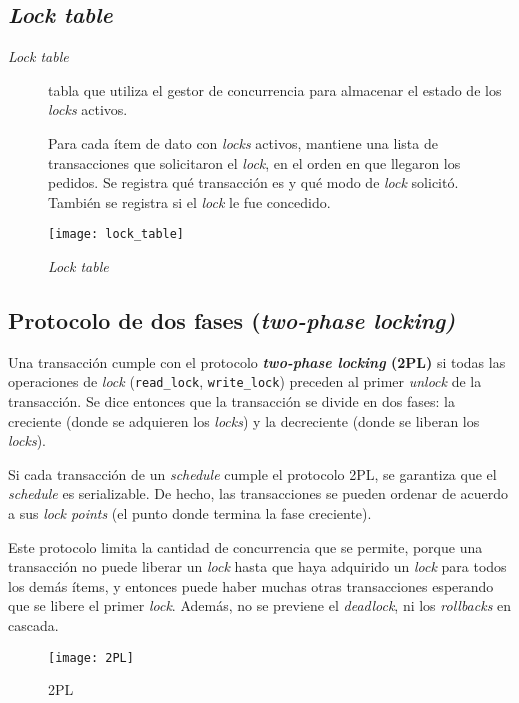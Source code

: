 \documentclass[a4paper, twoside]{article}
\begin{document}
\newpage
\subsection{\emph{Lock table}}
\begin{description}
	\item[\emph{Lock table}] tabla que utiliza el gestor de concurrencia para almacenar el estado de los \emph{locks} activos.

	Para cada ítem de dato con \emph{locks} activos, mantiene una lista de transacciones que solicitaron el \emph{lock}, en el orden en que llegaron los pedidos. Se registra qué transacción es y qué modo de \emph{lock} solicitó. También se registra si el \emph{lock} le fue concedido.
\end{description}

\begin{figure}[H]
	\centering
	\texttt{[image: lock\_table]}
	\caption{\emph{Lock table}}
\end{figure}

\subsection{Protocolo de dos fases (\emph{two-phase locking)}}
Una transacción cumple con el protocolo \textbf{\emph{two-phase locking} (2PL)} si todas las operaciones de \emph{lock} (\texttt{read\_lock}, \texttt{write\_lock}) preceden al primer \emph{unlock} de la transacción. Se dice entonces que la transacción se divide en dos fases: la creciente  (donde se adquieren los \emph{locks}) y la decreciente (donde se liberan los \emph{locks}).

Si cada transacción de un \emph{schedule} cumple el protocolo 2PL, se garantiza que el \emph{schedule} es serializable. De hecho, las transacciones se pueden ordenar de acuerdo a sus \emph{lock points} (el punto donde termina la fase creciente).

Este protocolo limita la cantidad de concurrencia que se permite, porque una transacción no puede liberar un \emph{lock} hasta que haya adquirido un \emph{lock} para todos los demás ítems, y entonces puede haber muchas otras transacciones esperando que se libere el primer \emph{lock}. Además, no se previene el \emph{deadlock}, ni los \emph{rollbacks} en cascada.

\begin{figure}[H]
	\centering
	\texttt{[image: 2PL]}
	\caption{2PL}
\end{figure}
\end{document}
